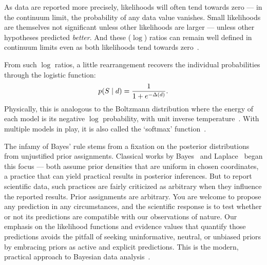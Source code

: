 As data are reported more precisely, likelihoods will often tend towards zero
--- in the continuum limit, the probability of any data value vanishes.
Small likelihoods are themselves not significant unless other likelihoods
are larger --- unless other hypotheses predicted \emph{better}.
And these ($\log$) ratios can remain well defined in continuum limits even as
both likelihoods tend towards zero~\cite{billingsley2008probability}.

From such $\log$ ratios, a little rearrangement recovers the individual
probabilities through the logistic function:
\begin{equation}
\label{eqn:searches_logistic}
p(S \mid d) = \frac{1}{1 + e^{-\Delta(d)}}
.
\end{equation}
Physically, this is analogous to the Boltzmann distribution where the energy
of each model is its negative $\log$ probability, with unit inverse
temperature~\cite{
pmlr-v2-ranzato07a,
skilling2017david
}.
With multiple models in play, it is also called the `softmax'
function~\cite{MurphyKevinP.2012Mlap}.

The infamy of Bayes' rule stems from a fixation on the posterior distributions
from unjustified prior assignments.
Classical works by
Bayes~\cite{bayes1763lii} and
Laplace~\cite{laplace1774stigler} began this focus ---
both assume prior densities that are uniform in chosen coordinates, a practice
that can yield practical results in posterior inferences.
But to report scientific data, such practices are fairly criticized as
arbitrary when they influence the reported results.
Prior assignments are arbitrary.
You are welcome to propose any prediction in any circumstances, and the
scientific response is to test whether or not its predictions are compatible
with our observations of nature.
Our emphasis on the likelihood functions and evidence values that quantify
those predictions avoids the pitfall of seeking uninformative, neutral, or
unbiased priors by embracing priors as active and explicit predictions.
This is the modern, practical approach to Bayesian data analysis~\cite{
mackay2003information,
skilling2004nested,
skilling2006nested,
sivia2006data,
skilling2010foundations
}.

